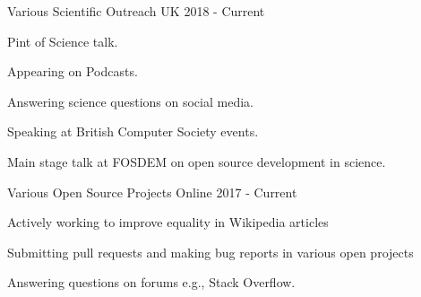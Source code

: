 \begin{cventries}
   \cventry
    {Various}
    {Scientific Outreach} %
    {UK}
    {2018 - Current}
    {\begin{cvitems} %
        \item {Pint of Science talk.}
        \item {Appearing on Podcasts.}
        \item {Answering science questions on social media.}
        \item {Speaking at British Computer Society events.}
        \item {Main stage talk at FOSDEM on open source development in science.}
      \end{cvitems}} %

   \cventry
    {Various}
    {Open Source Projects} %
    {Online}
    {2017 - Current}
    {
    \begin{cvitems} %
        \item {Actively working to improve equality in Wikipedia articles}
        \item {Submitting pull requests and making bug reports in various open projects}
        \item {Answering questions on forums e.g., Stack Overflow.}
      \end{cvitems}} %
    


\end{cventries}